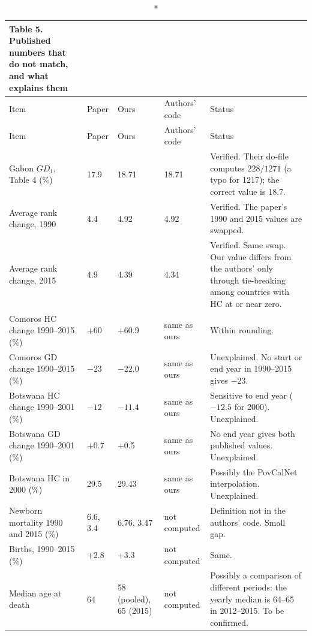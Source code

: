 \documentclass[12pt,a4paper]{article}
\begin{document}
\begin{longtable}{>{\raggedright}p{3.4cm}>{\raggedright}p{1.6cm}>{\raggedright}p{1.7cm}>{\raggedright}p{2cm}>{\raggedright\arraybackslash}p{5.2cm}}
\caption*{\textbf{Table 5.} Published numbers that do not match, and what explains them}\\
\toprule
Item & Paper & Ours & Authors' code & Status\\
\midrule
\endfirsthead
\toprule
Item & Paper & Ours & Authors' code & Status\\
\midrule
\endhead
Gabon $GD_1$, Table 4 (\%) & 17.9 & 18.71 & 18.71 & Verified. Their do-file computes $228/1271$ (a typo for 1217); the correct value is 18.7.\\
Average rank change, 1990 & 4.4 & 4.92 & 4.92 & Verified. The paper's 1990 and 2015 values are swapped.\\
Average rank change, 2015 & 4.9 & 4.39 & 4.34 & Verified. Same swap. Our value differs from the authors' only through tie-breaking among countries with HC at or near zero.\\
Comoros HC change 1990--2015 (\%) & +60 & +60.9 & same as ours & Within rounding.\\
Comoros GD change 1990--2015 (\%) & $-23$ & $-22.0$ & same as ours & Unexplained. No start or end year in 1990--2015 gives $-23$.\\
Botswana HC change 1990--2001 (\%) & $-12$ & $-11.4$ & same as ours & Sensitive to end year ($-12.5$ for 2000). Unexplained.\\
Botswana GD change 1990--2001 (\%) & +0.7 & +0.5 & same as ours & No end year gives both published values. Unexplained.\\
Botswana HC in 2000 (\%) & 29.5 & 29.43 & same as ours & Possibly the PovCalNet interpolation. Unexplained.\\
Newborn mortality 1990 and 2015 (\%) & 6.6, 3.4 & 6.76, 3.47 & not computed & Definition not in the authors' code. Small gap.\\
Births, 1990--2015 (\%) & +2.8 & +3.3 & not computed & Same.\\
Median age at death & 64 & 58 (pooled), 65 (2015) & not computed & Possibly a comparison of different periods: the yearly median is 64--65 in 2012--2015. To be confirmed.\\
\bottomrule
\end{longtable}
\end{document}

